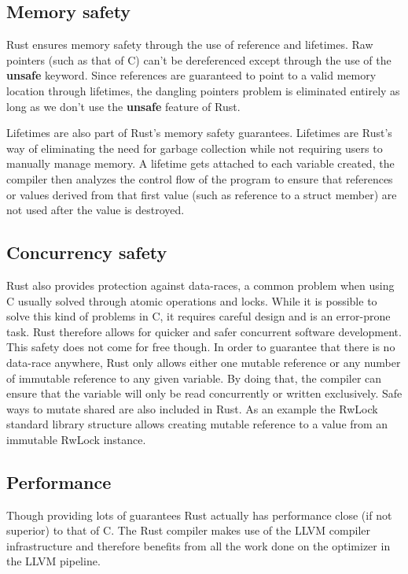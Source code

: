 \documentclass[11pt]{article}
\begin{document}
\subsection{Memory safety}

Rust ensures memory safety through the use of reference and
lifetimes. Raw pointers (such as that of C) can't be dereferenced
except through the use of the \textbf{unsafe} keyword. Since
references are guaranteed to point to a valid memory location through
lifetimes, the dangling pointers problem is eliminated entirely as
long as we don't use the \textbf{unsafe} feature of Rust.

Lifetimes are also part of Rust's memory safety guarantees. Lifetimes
are Rust's way of eliminating the need for garbage collection while
not requiring users to manually manage memory. A lifetime gets
attached to each variable created, the compiler then analyzes the
control flow of the program to ensure that references or values
derived from that first value (such as reference to a struct member)
are not used after the value is destroyed.

\subsection{Concurrency safety}
Rust also provides protection against data-races, a common problem
when using C usually solved through atomic operations and locks.
While it is possible to solve this kind of problems in C, it requires
careful design and is an error-prone task. Rust therefore allows for
quicker and safer concurrent software development. This safety does not
come for free though. In order to guarantee that there is no data-race
anywhere, Rust only allows either one mutable reference or any number
of immutable reference to any given variable. By doing that, the
compiler can ensure that the variable will only be read concurrently
or written exclusively. Safe ways to mutate shared are also included
in Rust. As an example the RwLock standard library structure allows
creating mutable reference to a value from an immutable RwLock
instance.

\subsection{Performance}
Though providing lots of guarantees Rust actually has performance
close (if not superior) to that of C. The Rust compiler makes use of
the LLVM compiler infrastructure and therefore benefits from all the
work done on the optimizer in the LLVM pipeline.
\end{document}

